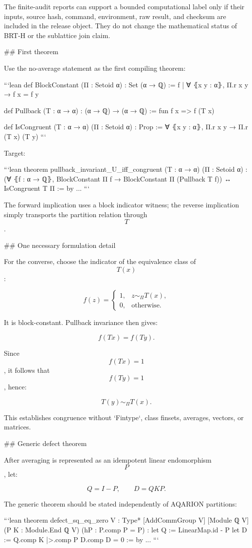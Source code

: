 The finite-audit reports can support a bounded computational label only if their inputs, source hash, command, environment, raw result, and checksum are included in the release object. They do not change the mathematical status of BRT-H or the sublattice join claim.

## First theorem

Use the no-average statement as the first compiling theorem:

```lean
def BlockConstant (Π : Setoid α) : Set (α → ℚ) :=
  {f | ∀ ⦃x y : α⦄, Π.r x y → f x = f y}

def Pullback (T : α → α) : (α → ℚ) → (α → ℚ) :=
  fun f x => f (T x)

def IsCongruent (T : α → α) (Π : Setoid α) : Prop :=
  ∀ ⦃x y : α⦄, Π.r x y → Π.r (T x) (T y)
```

Target:

```lean
theorem pullback_invariant_U_iff_congruent
    (T : α → α) (Π : Setoid α) :
    (∀ ⦃f : α → ℚ⦄, BlockConstant Π f →
      BlockConstant Π (Pullback T f))
      ↔ IsCongruent T Π := by
  ...
```

The forward implication uses a block indicator witness; the reverse implication simply transports the partition relation through $$T$$.

## One necessary formulation detail

For the converse, choose the indicator of the equivalence class of $$T(x)$$:

$$
f(z)=
\begin{cases}
1,&z\sim_\Pi T(x),\\
0,&\text{otherwise}.
\end{cases}
$$

It is block-constant. Pullback invariance then gives:

$$
f(Tx)=f(Ty).
$$

Since $$f(Tx)=1$$, it follows that $$f(Ty)=1$$, hence:

$$
T(y)\sim_\Pi T(x).
$$

This establishes congruence without `Fintype`, class finsets, averages, vectors, or matrices.

## Generic defect theorem

After averaging is represented as an idempotent linear endomorphism $$P$$, let:

$$
Q=I-P,\qquad D=QKP.
$$

The generic theorem should be stated independently of AQARION partitions:

```lean
theorem defect_sq_eq_zero
    {V : Type*} [AddCommGroup V] [Module ℚ V]
    (P K : Module.End ℚ V)
    (hP : P.comp P = P) :
    let Q := LinearMap.id - P
    let D := Q.comp K |>.comp P
    D.comp D = 0 := by
  ...
```

